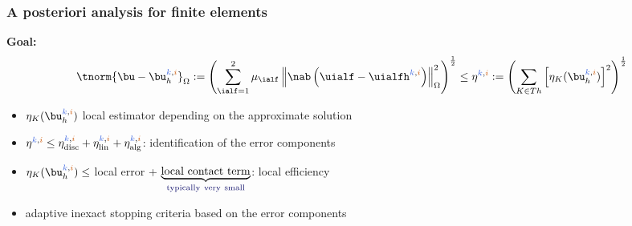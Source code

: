 
\begin{frame}
\frametitle{A posteriori analysis for finite elements}
\textcolor{cadmiumgreen}{\textbf{Goal:}}
\begin{equation*}
\tnorm{\bu-\bu_h^{\kk,\ii}}_{\Omega} \egaldef \left(\sum_{\ialf = 1}^2 \mu_\ialf \left\|\nab \left(\uialf-\uialfh^{\kk,\ii} \right)\right\|_{\Omega}^2 \right)^{\frac{1}{2}} \leq \eta^{\kk,\ii} \egaldef \left(\sum_{K \in Th}\left[\eta_{K}(\bu_h^{\kk,\ii}) \right]^2\right)^{\frac{1}{2}}
\end{equation*}
\begin{itemize}
\item $\eta_{K}(\bu_h^{\kk,\ii})$ local estimator depending on the approximate solution 
\item $\eta^{\kk,\ii} \leq \eta_{\mathrm{disc}}^{\kk,\ii} + \eta_{\mathrm{lin}}^{\kk,\ii} + \eta_{\mathrm{alg}}^{\kk,\ii}$: identification of the error components
\item $\eta_{K}(\bu_h^{\kk,\ii}) \leq$ local error + $\underbrace{\mathrm{local \ contact \ term}}_{\mathrm{\textcolor{midnightblue}{typically \ very \ small}}}$: local efficiency
\item adaptive inexact stopping criteria based on the error components
\end{itemize} 
\end{frame}
%

